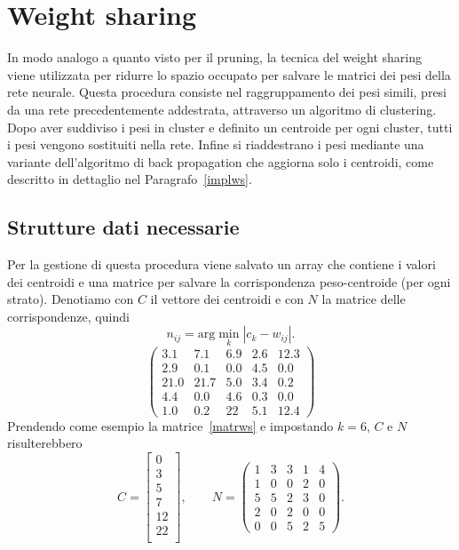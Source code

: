 \documentclass[11pt,a4paper,twoside,
openright]{book}
\begin{document}
\section{Weight sharing}
In modo analogo a quanto visto per il pruning, la tecnica del weight sharing~\cite{han2015compression} viene utilizzata per ridurre lo spazio occupato per salvare le matrici dei pesi della rete neurale. Questa procedura consiste nel raggruppamento dei pesi simili, presi da una rete precedentemente addestrata, attraverso un algoritmo di clustering. Dopo aver suddiviso i pesi in cluster e definito un centroide per ogni cluster, tutti i pesi vengono sostituiti nella rete. Infine si riaddestrano i pesi mediante una variante dell'algoritmo di back propagation che aggiorna solo i centroidi, come descritto in dettaglio nel Paragrafo~\ref{implws}.

\subsection{Strutture dati necessarie}
Per la gestione di questa procedura viene salvato un array che contiene i valori dei centroidi e una matrice per salvare la corrispondenza peso-centroide (per ogni strato).
Denotiamo con $C$ il vettore dei centroidi e con $N$ la matrice delle corrispondenze, quindi
\begin{equation}
n_{ij} = \text{arg}\min\limits_{k}|c_{k}-w_{ij}|.
\label{ws}
\end{equation}
\begin{equation}
\begin{pmatrix} 
3.1 & 7.1 & 6.9 & 2.6 & 12.3\\
2.9 & 0.1 & 0.0 & 4.5 & 0.0\\
21.0 & 21.7 & 5.0 & 3.4 & 0.2\\
4.4 & 0.0 & 4.6 & 0.3 & 0.0\\
1.0 & 0.2 & 22 & 5.1 & 12.4 
\end{pmatrix}
\label{matrws}
\end{equation}
Prendendo come esempio la matrice~\ref{matrws} e impostando $k=6$, $C$ e $N$ risulterebbero
\begin{equation}
C=
\begin{bmatrix} 
	0  \\
	3  \\
	5  \\
	7  \\
	12 \\
	22 \\
\end{bmatrix}, \qquad
N=
\begin{pmatrix} 
1 & 3 & 3 & 1 & 4\\
1 & 0 & 0 & 2 & 0\\
5 & 5 & 2 & 3 & 0\\
2 & 0 & 2 & 0 & 0\\
0 & 0 & 5 & 2 & 5 
\end{pmatrix}.
\label{NC}
\end{equation}
\end{document}
